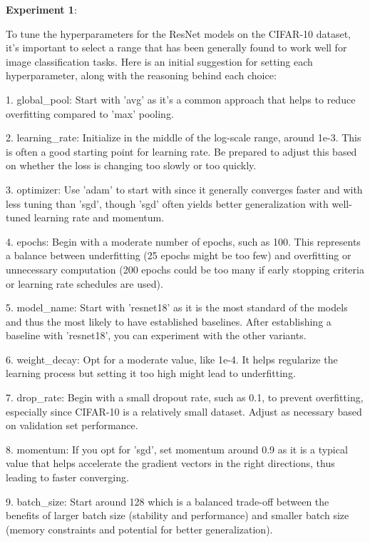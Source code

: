 \documentclass{article}
\begin{document}
\begin{tcolorbox}[enhanced jigsaw,breakable,pad at break*=1mm,
  colback=blue!5!white,colframe=blue!75!black,title=GPT-4 Experimental Logs,
  watermark color=white]
  
\textbf{Experiment 1}:

To tune the hyperparameters for the ResNet models on the CIFAR-10 dataset, it's important to select a range that has been generally found to work well for image classification tasks. Here is an initial suggestion for setting each hyperparameter, along with the reasoning behind each choice:

1. global\_pool: Start with 'avg' as it's a common approach that helps to reduce overfitting compared to 'max' pooling.

2. learning\_rate: Initialize in the middle of the log-scale range, around 1e-3. This is often a good starting point for learning rate. Be prepared to adjust this based on whether the loss is changing too slowly or too quickly.

3. optimizer: Use 'adam' to start with since it generally converges faster and with less tuning than 'sgd', though 'sgd' often yields better generalization with well-tuned learning rate and momentum.

4. epochs: Begin with a moderate number of epochs, such as 100. This represents a balance between underfitting (25 epochs might be too few) and overfitting or unnecessary computation (200 epochs could be too many if early stopping criteria or learning rate schedules are used).

5. model\_name: Start with 'resnet18' as it is the most standard of the models and thus the most likely to have established baselines. After establishing a baseline with 'resnet18', you can experiment with the other variants.

6. weight\_decay: Opt for a moderate value, like 1e-4. It helps regularize the learning process but setting it too high might lead to underfitting.

7. drop\_rate: Begin with a small dropout rate, such as 0.1, to prevent overfitting, especially since CIFAR-10 is a relatively small dataset. Adjust as necessary based on validation set performance.

8. momentum: If you opt for 'sgd', set momentum around 0.9 as it is a typical value that helps accelerate the gradient vectors in the right directions, thus leading to faster converging.

9. batch\_size: Start around 128 which is a balanced trade-off between the benefits of larger batch size (stability and performance) and smaller batch size (memory constraints and potential for better generalization).


\end{tcolorbox}
\end{document}
